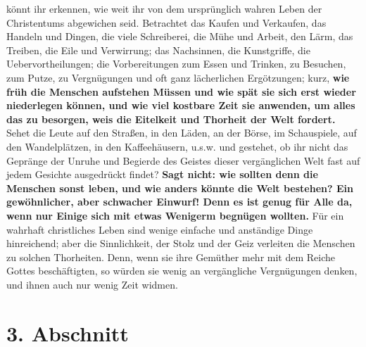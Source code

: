 könnt ihr erkennen, wie weit ihr von dem ursprünglich wahren Leben der
Christentums abgewichen seid. Betrachtet das Kaufen und Verkaufen, das Handeln
und Dingen, die viele Schreiberei, die Mühe und Arbeit, den Lärm, das Treiben,
die Eile und Verwirrung; das Nachsinnen, die Kunstgriffe, die
Uebervortheilungen; die Vorbereitungen zum Essen und Trinken, zu Besuchen, zum
Putze, zu Vergnügungen und oft ganz lächerlichen Ergötzungen; kurz, \textbf{wie früh die
Menschen aufstehen Müssen und wie spät sie sich erst wieder niederlegen können,
und wie viel kostbare Zeit sie anwenden, um alles das zu besorgen, weis die
Eitelkeit und Thorheit der Welt fordert.} Sehet die Leute auf den Straßen, in den
Läden, an der Börse, im Schauspiele, auf den Wandelplätzen, in den
Kaffeehäusern, u.s.w. und gestehet, ob ihr nicht das Gepränge der Unruhe und
Begierde des Geistes dieser vergänglichen Welt fast auf jedem Gesichte
ausgedrückt findet? \textbf{Sagt nicht: wie sollten denn die Menschen sonst leben, und
wie anders könnte die Welt bestehen? Ein gewöhnlicher, aber schwacher Einwurf!
Denn es ist genug für Alle da, wenn nur Einige sich mit etwas Wenigerm begnügen
wollten.} Für ein wahrhaft christliches Leben sind wenige einfache und anständige
Dinge hinreichend; aber die Sinnlichkeit, der Stolz und der Geiz verleiten die
Menschen zu solchen Thorheiten. Denn, wenn sie ihre Gemüther mehr mit dem Reiche
Gottes beschäftigten, so würden sie wenig an vergängliche Vergnügungen denken,
und ihnen auch nur wenig Zeit widmen.

\section{3. Abschnitt} \label{kap15_ab3}

